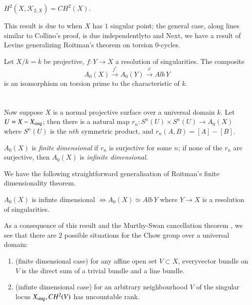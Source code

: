 \begin{thm1}
$H^{2}(X,\mathscr{K}_{2, X})=CH^{2}(X)$.
\end{thm1}

This result is due to \cite{Collino} when $X$ has $1$ singular point; the general case, along lines similar to Collino's proof, is due independently\pageoriginale to \cite{Levinea} and \cite{Pedrini} Next, we have a result of Levine generalizing Roitman's theorem on torsion $0$-cycles. 

\begin{thm}
Let $X/k=\overline{k}$ be projective, $f:Y\to X$ a resolution of singularities. The composite 
$$
A_0(X)\xrightarrow{f^{\ast}}A_0(Y)\xrightarrow{\varphi} Alb\, Y
$$
is an isomorphism on torsion prime to the characteristic of $k$. 
\end{thm}

\section{}
Now suppose $X$ is a normal projective surface over a universal domain $k$. Let $U=X-X_{\mathrm{sing}}$; then there is a natural map $r_n:S^{n}(U)\times S^{n}(U)\to A_0(X)$ where $S^{n}(U)$ is the $nth$ symmetric product, and $r_n(A, B)=[A]-[B]$. 

\begin{dfn}
$A_0(X)$ is \textit{finite dimensional} if $r_n$ is surjective for some $n$; if none of the $r_n$ are surjective, then $A_0(X)$ is \textit{infinite dimensional}. 
\end{dfn}

We have the following straightforward generalisation of Roitman's finite dimensionality theorem. 

\begin{thm}
$A_0(X)$ is infinte dimensional $\Leftrightarrow A_0(X)\simeq Alb\, Y$ where $Y\to X$ is a resolution of singularities. 
\end{thm}

As a consequence of this result and the Murthy-Swan cancellation theorem \cite{Murthy}, we see that there are $2$ possible situations for the Chow group over a universal domain: 
\begin{enumerate}
\renewcommand{\theenumi}{\roman{enumi}}
\renewcommand{\labelenumi}{(\theenumi)}
\item (finite dimensional case) for any affine open set $V\subset X$, every\pageoriginale vector bundle on $V$ is the direct sum of a trivial bundle and a line bundle. 
\item (infinte dimensional case) for an arbitrary neighbourhood $V$ of the singular locus $X_{\mathrm{sing}}, CH^{2}(V)$ has uncountable rank. 
\end{enumerate}

